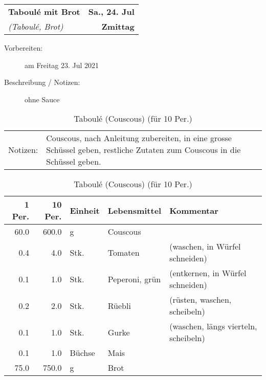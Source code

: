 \documentclass[11pt,a4paper]{article}%
\begin{document}
\begin{table}%
\begin{tabularx}{\textwidth}{X r}%
\LARGE \textbf{Taboulé mit Brot}&\color{gray} \large \textbf{Sa., 24. Jul}\\%
\small \textit{(Taboulé, Brot)}&\color{gray} \large \textbf{Zmittag}\\%
\hline%
\end{tabularx}%
\end{table}

%
\begin{description}%
\item[Vorbereiten:]%
am Freitag 23. Jul 2021%
\item[Beschreibung / Notizen:]%
ohne Sauce%
\end{description}%
\vspace{0.75cm}%
\renewcommand{\arraystretch}{1.25}%


\begin{table}[h]%
\caption{Taboulé (Couscous) (für 10 Per.)}%
\begin{tabularx}{\textwidth}{l X}%
Notizen:&Couscous, nach Anleitung zubereiten, in eine grosse Schüssel geben, restliche Zutaten zum Couscous in die Schüssel geben. \\%
\end{tabularx}%
\par%
\begin{tabularx}{\textwidth}{| r | r | l | l | X |}%
\hline%
\tiny{1 Per.}&\tiny{10 Per.}&\tiny{Einheit}&\tiny{Lebensmittel}&\tiny{Kommentar}\\%
\hline%
60.0&600.0&g&Couscous&\\%
\hline%
0.4&4.0&Stk.&Tomaten&(waschen, in Würfel schneiden)\\%
\hline%
0.1&1.0&Stk.&Peperoni, grün& (entkernen, in Würfel schneiden)\\%
\hline%
0.2&2.0&Stk.&Rüebli&(rüsten, waschen, scheibeln)\\%
\hline%
0.1&1.0&Stk.&Gurke&(waschen, längs vierteln, scheibeln)\\%
\hline%
0.1&1.0&Büchse&Mais&\\%
\hline%
75.0&750.0&g&Brot&\\%
\hline%
\end{tabularx}%
\end{table}

%
\vspace{0.75cm}%
\renewcommand{\arraystretch}{1.25}%
\end{document}
